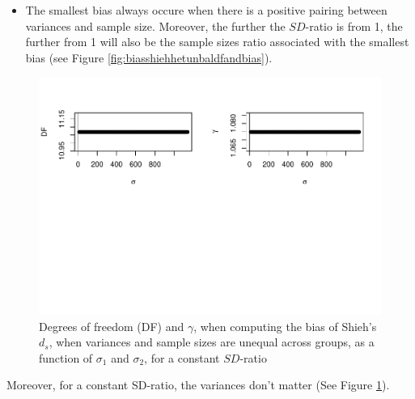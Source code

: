 \documentclass[
  man]{apa6}
\providecommand{\tightlist}{%
  \setlength{\itemsep}{0pt}\setlength{\parskip}{0pt}}
\begin{document}
\begin{itemize}
\tightlist
\item
  The smallest bias always occure when there is a positive pairing between variances and sample size. Moreover, the further the \(SD\)-ratio is from 1, the further from 1 will also be the sample sizes ratio associated with the smallest bias (see Figure \ref{fig:biasshiehhetunbaldfandbias}).
\end{itemize}

\begin{figure}
\centering
\includegraphics{Theoretical-Bias-of-all-estimators-as-a-function-of-population-parameters_files/figure-latex/biasshiehhetunbalvariance2-1.pdf}
\caption{\label{fig:biasshiehhetunbalvariance2}Degrees of freedom (DF) and \(\gamma\), when computing the bias of Shieh's \(d_s\), when variances and sample sizes are unequal across groups, as a function of \(\sigma_1\) and \(\sigma_2\), for a constant \(SD\)-ratio}
\end{figure}

Moreover, for a constant SD-ratio, the variances don't matter (See Figure \ref{fig:biasshiehhetunbalvariance2}).
\end{document}

